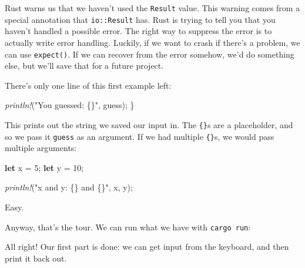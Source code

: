 \documentclass[a4paper,]{book}
\newenvironment{Shaded}{\begin{snugshade}}{\end{snugshade}}
\newcommand{\KeywordTok}[1]{\textcolor[rgb]{0.13,0.29,0.53}{\textbf{{#1}}}}
\newcommand{\DecValTok}[1]{\textcolor[rgb]{0.00,0.00,0.81}{{#1}}}
\newcommand{\StringTok}[1]{\textcolor[rgb]{0.31,0.60,0.02}{{#1}}}
\newcommand{\PreprocessorTok}[1]{\textcolor[rgb]{0.56,0.35,0.01}{\textit{{#1}}}}
\newcommand{\NormalTok}[1]{{#1}}
\begin{document}
Rust warns us that we haven't used the \texttt{Result} value. This
warning comes from a special annotation that \texttt{io::Result} has.
Rust is trying to tell you that you haven't handled a possible error.
The right way to suppress the error is to actually write error handling.
Luckily, if we want to crash if there's a problem, we can use
\texttt{expect()}. If we can recover from the error somehow, we'd do
something else, but we'll save that for a future project.

There's only one line of this first example left:

\begin{Shaded}
\begin{Highlighting}[]
    \PreprocessorTok{println!}\NormalTok{(}\StringTok{"You guessed: \{\}"}\NormalTok{, guess);}
\NormalTok{\}}
\end{Highlighting}
\end{Shaded}

This prints out the string we saved our input in. The \texttt{\{\}}s are
a placeholder, and so we pass it \texttt{guess} as an argument. If we
had multiple \texttt{\{\}}s, we would pass multiple arguments:

\begin{Shaded}
\begin{Highlighting}[]
\KeywordTok{let} \NormalTok{x = }\DecValTok{5}\NormalTok{;}
\KeywordTok{let} \NormalTok{y = }\DecValTok{10}\NormalTok{;}

\PreprocessorTok{println!}\NormalTok{(}\StringTok{"x and y: \{\} and \{\}"}\NormalTok{, x, y);}
\end{Highlighting}
\end{Shaded}

Easy.

Anyway, that's the tour. We can run what we have with
\texttt{cargo\ run}:

\begin{Shaded}
\end{Shaded}

All right! Our first part is done: we can get input from the keyboard,
and then print it back out.
\end{document}
